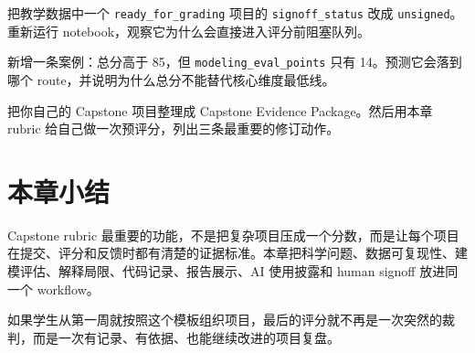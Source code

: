 \begin{exercisebox}[基础练习]
把教学数据中一个 \texttt{ready\_for\_grading} 项目的 \texttt{signoff\_status} 改成 \texttt{unsigned}。重新运行 notebook，观察它为什么会直接进入评分前阻塞队列。
\end{exercisebox}

\begin{exercisebox}[进阶练习]
新增一条案例：总分高于 85，但 \texttt{modeling\_eval\_points} 只有 14。预测它会落到哪个 route，并说明为什么总分不能替代核心维度最低线。
\end{exercisebox}

\begin{exercisebox}[开放练习]
把你自己的 Capstone 项目整理成 Capstone Evidence Package。然后用本章 rubric 给自己做一次预评分，列出三条最重要的修订动作。
\end{exercisebox}

\section{本章小结}

Capstone rubric 最重要的功能，不是把复杂项目压成一个分数，而是让每个项目在提交、评分和反馈时都有清楚的证据标准。本章把科学问题、数据可复现性、建模评估、解释局限、代码记录、报告展示、AI 使用披露和 human signoff 放进同一个 workflow。

如果学生从第一周就按照这个模板组织项目，最后的评分就不再是一次突然的裁判，而是一次有记录、有依据、也能继续改进的项目复盘。
